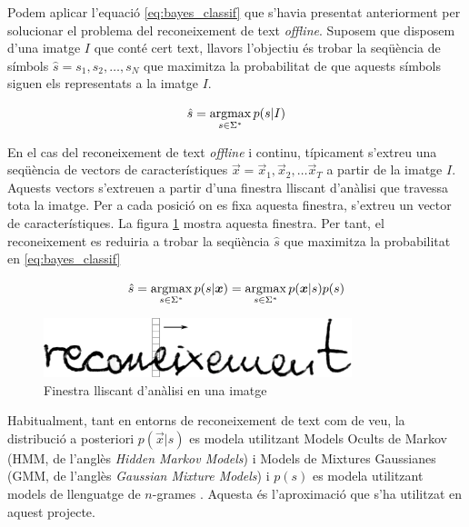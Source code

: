 Podem aplicar l'equació \ref{eq:bayes_classif} que s'havia presentat anteriorment per solucionar el problema del reconeixement de text \emph{offline}. Suposem que disposem d'una imatge $I$ que conté cert text, llavors l'objectiu és trobar la seqüència de símbols $\hat{s} = s_1, s_2, \ldots, s_N$ que maximitza la probabilitat de que aquests símbols siguen els representats a la imatge $I$.

\begin{equation}\label{eq:}
\hat{s} = \operatorname*{argmax}_{s \in \Sigma^*} p(s|I)
\end{equation}

En el cas del reconeixement de text \emph{offline} i continu, típicament s'extreu una seqüència de vectors de característiques $\vec{x} = \vec{x}_1, \vec{x}_2, \ldots \vec{x}_T$ a partir de la imatge $I$. Aquests vectors s'extreuen a partir d'una finestra lliscant d'anàlisi que travessa tota la imatge. Per a cada posició on es fixa aquesta finestra, s'extreu un vector de característiques. La figura \ref{fig:finestra_lliscant} mostra aquesta finestra. Per tant, el reconeixement es reduiria a trobar la seqüència $\hat{s}$ que maximitza la probabilitat en  \ref{eq:bayes_classif}

\begin{equation}\label{eq:bayes_classif_vectors}
\hat{s} = \argmax_{s \in \Sigma^*} p(s|\vec{x}) = \argmax_{s \in \Sigma^*} p(\vec{x}|s) p(s) %
\end{equation}

\begin{figure}
\centering
\includegraphics[width=0.8\textwidth]{images/finestra_lliscant.eps}
\caption{Finestra lliscant d'anàlisi en una imatge}
\label{fig:finestra_lliscant}
\end{figure}

Habitualment, tant en entorns de reconeixement de text com de veu, la distribució a posteriori $p(\vec{x}|s)$ es modela utilitzant Models Ocults de Markov (HMM, de l'anglès \emph{Hidden Markov Models}) i Models de Mixtures Gaussianes (GMM, de l'anglès \emph{Gaussian Mixture Models}) \cite{huanghidden, jelinek1998statistical, ghahramani2001introduction} i $p(s)$ es modela utilitzant models de llenguatge de $n$-grames \cite{jelinek1998statistical,katz1987estimation,marti2001using}. Aquesta és l'aproximació que s'ha utilitzat en aquest projecte.